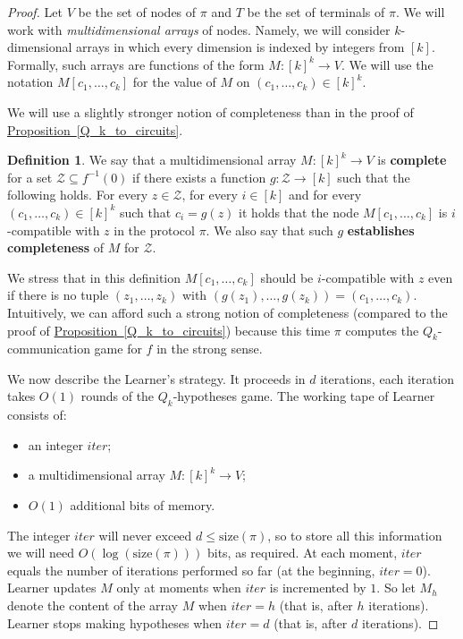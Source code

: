 \documentclass[11pt]{article}
\numberwithin{equation}{section}
\theoremstyle{definition}
\newtheorem{definition}[theorem]{Definition}
\theoremstyle{plain}
\newcommand{\expref}[2]{\hyperref[#2]{#1~\ref{#2}}}
\begin{document}
\begin{proof}
Let $V$ be the set of nodes of $\pi$ and $T$ be the set of terminals of $\pi$.  We will work with \emph{multidimensional arrays} of nodes. Namely, we will consider $k$-dimensional arrays in which every dimension is indexed by integers from $[k]$. Formally, such arrays are functions of the form $M\colon [k]^k\to V$. We will use the notation $M[c_1, \ldots, c_k]$ for the value of $M$ on $(c_1, \ldots, c_k) \in [k]^k$.

We will use a slightly stronger notion of completeness than in the proof of \expref{Proposition}{Q_k_to_circuits}.

\begin{definition}
 We say that a multidimensional array $M\colon [k]^k \to V$ is \textbf{complete} for a set $\mathcal{Z}\subseteq f^{-1}(0)$ if there exists a function $g\colon\mathcal{Z} \to [k]$ such that the following holds. For every $z\in \mathcal{Z}$, for every $i\in [k]$ and for every $(c_1, \ldots, c_k)\in [k]^k$ such that $c_i = g(z)$ it holds that the node $M[c_1, \ldots, c_k]$ is $i$-compatible with $z$ in the protocol $\pi$. We also say that such $g$ \textbf{establishes completeness} of $M$ for $\mathcal{Z}$.
\end{definition}

We stress that in this definition $M[c_1, \ldots, c_k]$ should be $i$-compatible with $z$ even if there is no tuple $(z_1, \ldots, z_k)$ with $(g(z_1), \ldots, g(z_k)) = (c_1, \ldots, c_k)$. Intuitively, we can afford such a strong notion of completeness (compared to the proof of \expref{Proposition}{Q_k_to_circuits}) because this time $\pi$ computes the $Q_k$-communication game for $f$ in the strong sense.

We now describe the Learner's strategy. It proceeds in $d$ iterations, each iteration takes $O(1)$ rounds of the $Q_k$-hypotheses game. The working tape of Learner consists of:
\begin{itemize}
\item an integer $iter$;
\item a multidimensional array $M\colon [k]^k \to V$;
\item $O(1)$ additional bits of memory. 
\end{itemize}
The integer $iter$ will never exceed $d\le \mathrm{size}(\pi)$, so to store all this information we will need $O(\log (\mathrm{size}(\pi)))$ bits, as required. At each moment, $iter$ equals the number of iterations performed so far (at the beginning, $iter = 0$). Learner updates $M$ only at moments when $iter$ is incremented by $1$. So let $M_h$ denote the content of the array $M$ when $iter = h$ (that is, after $h$ iterations). Learner stops making hypotheses when $iter = d$ (that is, after $d$ iterations).


\end{proof}
\end{document}
